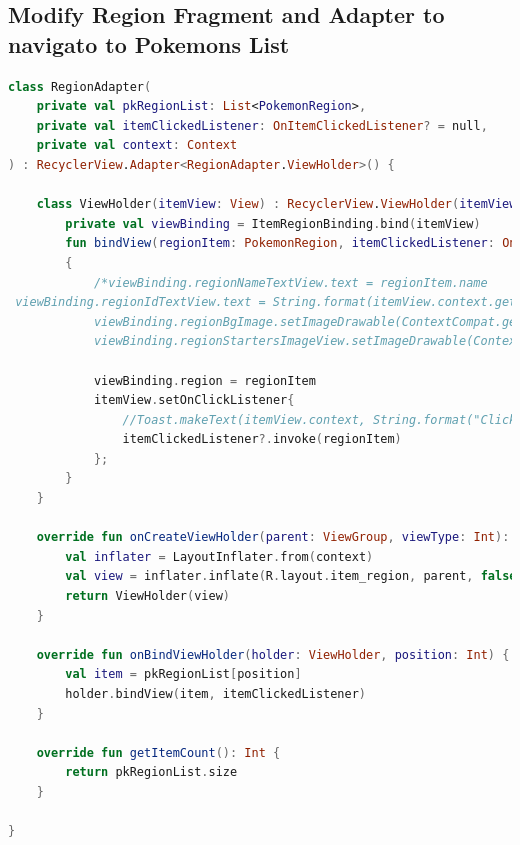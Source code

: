 \documentclass[a4paper, 12pt]{article}
\begin{document}
\subsection{Modify Region Fragment and Adapter to navigato to Pokemons List}

\begin{lstlisting}[caption={Region Adapter to suport navigation code.}, label={code:code_region_adapter_nav}, language=Kotlin]
    class RegionAdapter(
    private val pkRegionList: List<PokemonRegion>,
    private val itemClickedListener: OnItemClickedListener? = null,
    private val context: Context
) : RecyclerView.Adapter<RegionAdapter.ViewHolder>() {

    class ViewHolder(itemView: View) : RecyclerView.ViewHolder(itemView) {
        private val viewBinding = ItemRegionBinding.bind(itemView)
        fun bindView(regionItem: PokemonRegion, itemClickedListener: OnItemClickedListener?)
        {
            /*viewBinding.regionNameTextView.text = regionItem.name
 viewBinding.regionIdTextView.text = String.format(itemView.context.getString(R.string.pk_generations), regionItem.id)
            viewBinding.regionBgImage.setImageDrawable(ContextCompat.getDrawable(itemView.context,regionItem.bg))
            viewBinding.regionStartersImageView.setImageDrawable(ContextCompat.getDrawable(itemView.context,regionItem.starters))*/

            viewBinding.region = regionItem
            itemView.setOnClickListener{
                //Toast.makeText(itemView.context, String.format("Click in %s Region", regionItem.name), Toast.LENGTH_LONG).show()
                itemClickedListener?.invoke(regionItem)
            };
        }
    }

    override fun onCreateViewHolder(parent: ViewGroup, viewType: Int): ViewHolder {
        val inflater = LayoutInflater.from(context)
        val view = inflater.inflate(R.layout.item_region, parent, false)
        return ViewHolder(view)
    }

    override fun onBindViewHolder(holder: ViewHolder, position: Int) {
        val item = pkRegionList[position]
        holder.bindView(item, itemClickedListener)
    }

    override fun getItemCount(): Int {
        return pkRegionList.size
    }

}
\end{lstlisting}
\end{document}
